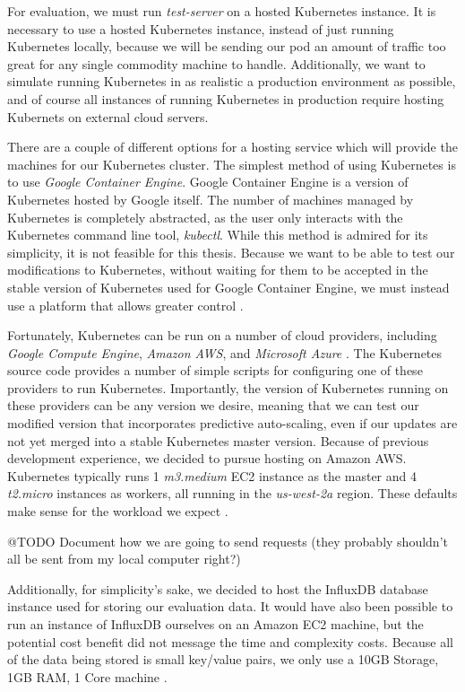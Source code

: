 For evaluation, we must run \textit{test-server} on a hosted Kubernetes
instance. It is necessary to use a hosted Kubernetes instance, instead of just
running Kubernetes locally, because we will be sending our pod an amount of
traffic too great for any single commodity machine to handle. Additionally, we
want to simulate running Kubernetes in as realistic a production environment as
possible, and of course all instances of running Kubernetes in production
require hosting Kubernets on external cloud servers.

There are a couple of different options for a hosting service which will provide
the machines for our Kubernetes cluster. The simplest method
of using Kubernetes is to use \textit{Google Container
Engine}. Google Container Engine is a version of Kubernetes hosted by Google
itself. The number of machines managed by Kubernetes is completely abstracted,
as the user only interacts with the Kubernetes command line tool,
\textit{kubectl}. While this method is admired for its simplicity, it is not
feasible for this thesis. Because we want to be able to test our modifications
to Kubernetes, without waiting for them to be accepted in the stable version of
Kubernetes used for Google Container Engine, we must instead use a platform that
allows greater control \cite{getting-started-k8s}.

Fortunately, Kubernetes can be run on a number of cloud providers, including
\textit{Google Compute Engine}, \textit{Amazon AWS}, and \textit{Microsoft
Azure} \cite{getting-started-k8s}.
The Kubernetes source code provides a number of simple scripts for
configuring one of these providers to run Kubernetes. Importantly, the version
of Kubernetes running on these providers can be any version we desire, meaning
that we can test our modified version that incorporates predictive auto-scaling,
even if our updates are not yet merged into a stable Kubernetes master version.
Because of previous development experience, we decided to
pursue hosting on Amazon AWS. Kubernetes typically runs 1 \textit{m3.medium}
EC2 instance as the master and 4 \textit{t2.micro} instances as workers, all
running in the \textit{us-west-2a} region. These defaults make
sense for the workload we expect \cite{getting-started-k8s-aws}.

@TODO Document how we are going to send requests (they probably shouldn't all be
sent from my local computer right?)

Additionally, for simplicity's sake, we decided to host the InfluxDB database
instance used for storing our evaluation data. It would have also been possible
to run an instance of InfluxDB ourselves on an Amazon EC2 machine, but the
potential cost benefit did not message the time and complexity costs. Because
all of the data being stored is small key/value pairs, we only use a 10GB
Storage, 1GB RAM, 1 Core machine \cite{influxdb-pricing}.

